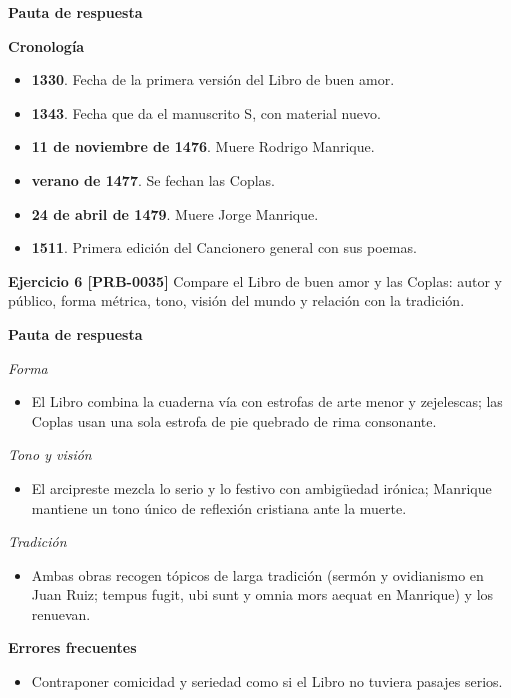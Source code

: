 \documentclass{book}
\begin{document}
\noindent\textbf{Pauta de respuesta}

\noindent\textbf{Cronología}
\begin{itemize}
\item \textbf{1330}. Fecha de la primera versión del Libro de buen amor.
\item \textbf{1343}. Fecha que da el manuscrito S, con material nuevo.
\item \textbf{11 de noviembre de 1476}. Muere Rodrigo Manrique.
\item \textbf{verano de 1477}. Se fechan las Coplas.
\item \textbf{24 de abril de 1479}. Muere Jorge Manrique.
\item \textbf{1511}. Primera edición del Cancionero general con sus poemas.
\end{itemize}

\noindent\textbf{Ejercicio 6 [PRB-0035]}
Compare el Libro de buen amor y las Coplas: autor y público, forma métrica, tono, visión del mundo y relación con la tradición.


\noindent\textbf{Pauta de respuesta}

\noindent\textit{Forma}
\begin{itemize}
\item El Libro combina la cuaderna vía con estrofas de arte menor y zejelescas; las Coplas usan una sola estrofa de pie quebrado de rima consonante.
\end{itemize}

\noindent\textit{Tono y visión}
\begin{itemize}
\item El arcipreste mezcla lo serio y lo festivo con ambigüedad irónica; Manrique mantiene un tono único de reflexión cristiana ante la muerte.
\end{itemize}

\noindent\textit{Tradición}
\begin{itemize}
\item Ambas obras recogen tópicos de larga tradición (sermón y ovidianismo en Juan Ruiz; tempus fugit, ubi sunt y omnia mors aequat en Manrique) y los renuevan.
\end{itemize}

\noindent\textbf{Errores frecuentes}
\begin{itemize}
\item Contraponer comicidad y seriedad como si el Libro no tuviera pasajes serios.
\end{itemize}
\end{document}
